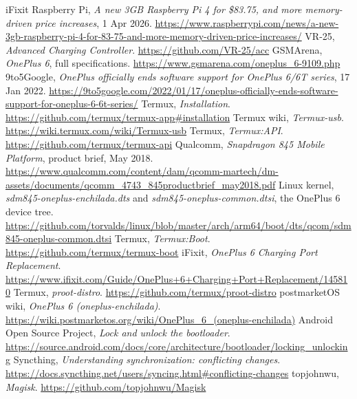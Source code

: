 \documentclass[11pt,a4paper]{article}
\begin{document}
\begin{thebibliography}{iFixit}
   Raspberry Pi, \textit{A new 3GB Raspberry Pi 4 for \$83.75, and more memory-driven price increases}, 1 Apr 2026. \url{https://www.raspberrypi.com/news/a-new-3gb-raspberry-pi-4-for-83-75-and-more-memory-driven-price-increases/}
   VR-25, \textit{Advanced Charging Controller}. \url{https://github.com/VR-25/acc}
   GSMArena, \textit{OnePlus 6}, full specifications. \url{https://www.gsmarena.com/oneplus_6-9109.php}
   9to5Google, \textit{OnePlus officially ends software support for OnePlus 6/6T series}, 17 Jan 2022. \url{https://9to5google.com/2022/01/17/oneplus-officially-ends-software-support-for-oneplus-6-6t-series/}
   Termux, \textit{Installation}. \url{https://github.com/termux/termux-app#installation}
   Termux wiki, \textit{Termux-usb}. \url{https://wiki.termux.com/wiki/Termux-usb}
   Termux, \textit{Termux:API}. \url{https://github.com/termux/termux-api}
   Qualcomm, \textit{Snapdragon 845 Mobile Platform}, product brief, May 2018. \url{https://www.qualcomm.com/content/dam/qcomm-martech/dm-assets/documents/qcomm_4743_845productbrief_may2018.pdf}
   Linux kernel, \textit{sdm845-oneplus-enchilada.dts} and \textit{sdm845-oneplus-common.dtsi}, the OnePlus 6 device tree. \url{https://github.com/torvalds/linux/blob/master/arch/arm64/boot/dts/qcom/sdm845-oneplus-common.dtsi}
   Termux, \textit{Termux:Boot}. \url{https://github.com/termux/termux-boot}
   iFixit, \textit{OnePlus 6 Charging Port Replacement}. \url{https://www.ifixit.com/Guide/OnePlus+6+Charging+Port+Replacement/145810}
   Termux, \textit{proot-distro}. \url{https://github.com/termux/proot-distro}
   postmarketOS wiki, \textit{OnePlus 6 (oneplus-enchilada)}. \url{https://wiki.postmarketos.org/wiki/OnePlus_6_(oneplus-enchilada)}
   Android Open Source Project, \textit{Lock and unlock the bootloader}. \url{https://source.android.com/docs/core/architecture/bootloader/locking_unlocking}
   Syncthing, \textit{Understanding synchronization: conflicting changes}. \url{https://docs.syncthing.net/users/syncing.html#conflicting-changes}
   topjohnwu, \textit{Magisk}. \url{https://github.com/topjohnwu/Magisk}
\end{thebibliography}

\revisiontable
\end{document}
